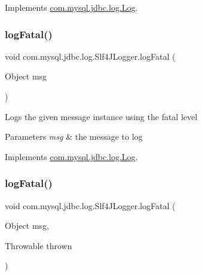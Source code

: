 Implements \mbox{\hyperlink{interfacecom_1_1mysql_1_1jdbc_1_1log_1_1_log_abca2e1258e8b1bca83fd13066e8930cd}{com.\+mysql.\+jdbc.\+log.\+Log}}.

\mbox{\label{classcom_1_1mysql_1_1jdbc_1_1log_1_1_slf4_j_logger_ab003102c3b7864c6d3bb2560cff3dbfa}} 
\subsubsection{\texorpdfstring{log\+Fatal()}{logFatal()}\hspace{0.1cm}{\footnotesize\ttfamily [1/2]}}
{\footnotesize\ttfamily void com.\+mysql.\+jdbc.\+log.\+Slf4\+J\+Logger.\+log\+Fatal (\begin{DoxyParamCaption}\item[{Object}]{msg }\end{DoxyParamCaption})}

Logs the given message instance using the \textquotesingle{}fatal\textquotesingle{} level


\begin{DoxyParams}{Parameters}
{\em msg} & the message to log \\
\hline
\end{DoxyParams}


Implements \mbox{\hyperlink{interfacecom_1_1mysql_1_1jdbc_1_1log_1_1_log_a8d3b6b295ded6eaa1bfa50ffca6a4d28}{com.\+mysql.\+jdbc.\+log.\+Log}}.

\mbox{\label{classcom_1_1mysql_1_1jdbc_1_1log_1_1_slf4_j_logger_a10bac00b095b12a28fbd9e988e50504e}} 
\subsubsection{\texorpdfstring{log\+Fatal()}{logFatal()}\hspace{0.1cm}{\footnotesize\ttfamily [2/2]}}
{\footnotesize\ttfamily void com.\+mysql.\+jdbc.\+log.\+Slf4\+J\+Logger.\+log\+Fatal (\begin{DoxyParamCaption}\item[{Object}]{msg,  }\item[{Throwable}]{thrown }\end{DoxyParamCaption})}

